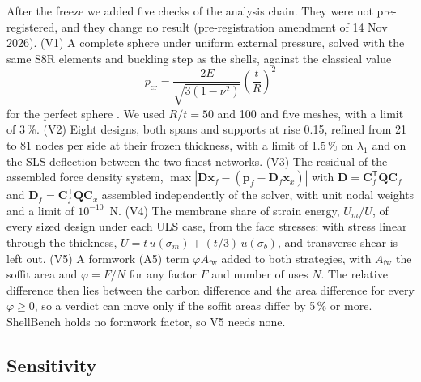 \documentclass[preprint,12pt]{elsarticle}
\begin{document}
\begin{table}[!htbp]
\centering
\caption{Validation tests S1--S5 and the solver cross-check, with the tolerances fixed in the pre-registration. S2 and S3 values are from the recorded (cloud) run; a second machine gives the same order of magnitude.}
\label{tab:validation}

\end{table}

After the freeze we added five checks of the analysis chain. They were not pre-registered, and they change no result (pre-registration amendment of 14 Nov 2026).
(V1) A complete sphere under uniform external pressure, solved with the same S8R elements and buckling step as the shells, against the classical value
\begin{equation}
p_\mathrm{cr} = \frac{2E}{\sqrt{3(1-\nu^2)}}\left(\frac{t}{R}\right)^2
\label{eq:zoelly}
\end{equation}
for the perfect sphere \cite[Section~3]{Hutchinson2016}. We used $R/t = 50$ and 100 and five meshes, with a limit of 3\,\%.
(V2) Eight designs, both spans and supports at rise 0.15, refined from 21 to 81 nodes per side at their frozen thickness, with a limit of 1.5\,\% on $\lambda_1$ and on the SLS deflection between the two finest networks.
(V3) The residual of the assembled force density system, $\max|\mathbf{D}\mathbf{x}_f - (\mathbf{p}_f - \mathbf{D}_f\mathbf{x}_x)|$ with $\mathbf{D} = \mathbf{C}_f^{\mathsf T}\mathbf{Q}\mathbf{C}_f$ and $\mathbf{D}_f = \mathbf{C}_f^{\mathsf T}\mathbf{Q}\mathbf{C}_x$ assembled independently of the solver, with unit nodal weights and a limit of $10^{-10}$~N.
(V4) The membrane share of strain energy, $U_m/U$, of every sized design under each ULS case, from the face stresses: with stress linear through the thickness, $U = t\,u(\sigma_m) + (t/3)\,u(\sigma_b)$, and transverse shear is left out.
(V5) A formwork (A5) term $\varphi A_\mathrm{fw}$ added to both strategies, with $A_\mathrm{fw}$ the soffit area and $\varphi = F/N$ for any factor $F$ and number of uses $N$. The relative difference then lies between the carbon difference and the area difference for every $\varphi \geq 0$, so a verdict can move only if the soffit areas differ by 5\,\% or more. ShellBench holds no formwork factor, so V5 needs none.

\subsection{Sensitivity}\label{sec:sensitivity}
\end{document}
